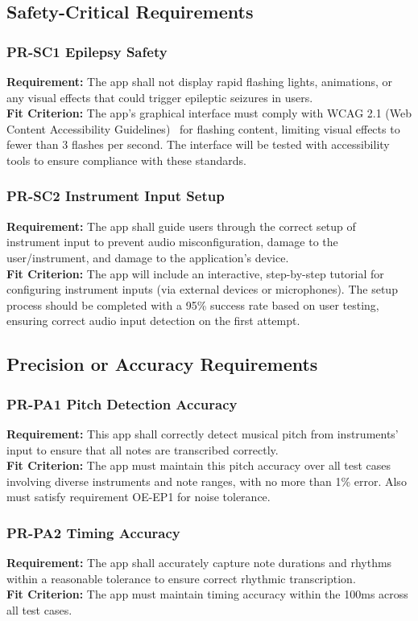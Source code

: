 \documentclass[12pt]{article}
\begin{document}
\subsection{Safety-Critical Requirements}
\subsubsection*{PR-SC1 Epilepsy Safety}
\textbf{Requirement:} The app shall not display rapid flashing lights, animations, or any visual effects that could trigger epileptic seizures in users.\\
\textbf{Fit Criterion:} The app’s graphical interface must comply with WCAG 2.1 (Web Content Accessibility Guidelines)~\cite{WCAG-Seizures} for flashing content, limiting visual effects to fewer than 3 flashes per second. The interface will be tested with accessibility tools to ensure compliance with these standards.
\subsubsection*{PR-SC2 Instrument Input Setup}
\textbf{Requirement:} The app shall guide users through the correct setup of instrument input to prevent audio misconfiguration, damage to the user/instrument, and damage to the application’s device.\\
\textbf{Fit Criterion:} The app will include an interactive, step-by-step tutorial for configuring instrument inputs (via external devices or microphones). The setup process should be completed with a 95\% success rate based on user testing, ensuring correct audio input detection on the first attempt.

\subsection{Precision or Accuracy Requirements}
\subsubsection*{PR-PA1 Pitch Detection Accuracy}
\textbf{Requirement:} This app shall correctly detect musical pitch from instruments' input to ensure that all notes are transcribed correctly.\\
\textbf{Fit Criterion:} The app must maintain this pitch accuracy over all test cases involving diverse instruments and note ranges, with no more than 1\% error. Also must satisfy requirement OE-EP1 for noise tolerance.
\subsubsection*{PR-PA2 Timing Accuracy}
\textbf{Requirement:} The app shall accurately capture note durations and rhythms within a reasonable tolerance to ensure correct rhythmic transcription.\\
\textbf{Fit Criterion:} The app must maintain timing accuracy within the 100ms across all test cases.
\end{document}
